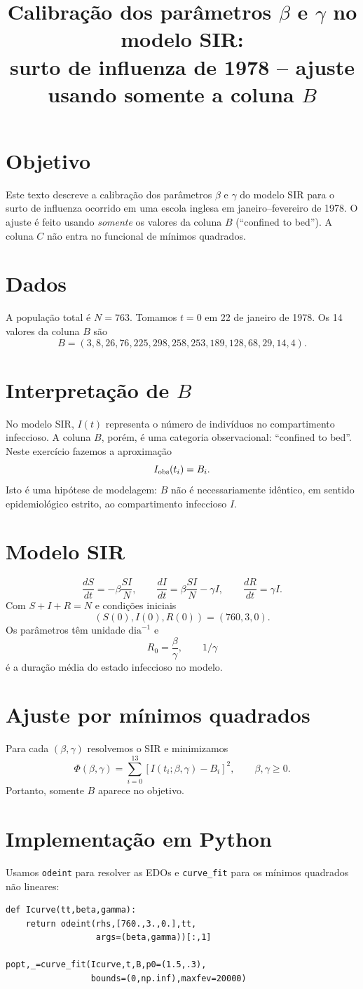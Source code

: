 \documentclass[12pt]{article}
\title{Calibração dos parâmetros $\beta$ e $\gamma$ no modelo SIR:\\ surto de influenza de 1978 -- ajuste usando somente a coluna $B$}
\author{}
\date{}
\begin{document}
\maketitle
\section{Objetivo}
Este texto descreve a calibração dos parâmetros $\beta$ e $\gamma$ do modelo SIR para o surto de influenza ocorrido em uma escola inglesa em janeiro--fevereiro de 1978. O ajuste é feito usando \emph{somente} os valores da coluna $B$ (``confined to bed''). A coluna $C$ não entra no funcional de mínimos quadrados.
\section{Dados}
A população total é $N=763$. Tomamos $t=0$ em 22 de janeiro de 1978. Os 14 valores da coluna $B$ são
\[
B=(3,8,26,76,225,298,258,253,189,128,68,29,14,4).
\]
\section{Interpretação de $B$}
No modelo SIR, $I(t)$ representa o número de indivíduos no compartimento infeccioso. A coluna $B$, porém, é uma categoria observacional: ``confined to bed''. Neste exercício fazemos a aproximação
\[
I_{\rm obs}(t_i)=B_i.
\]
Isto é uma hipótese de modelagem: $B$ não é necessariamente idêntico, em sentido epidemiológico estrito, ao compartimento infeccioso $I$.
\section{Modelo SIR}
\[
\frac{dS}{dt}=-\beta\frac{SI}{N},\qquad
\frac{dI}{dt}=\beta\frac{SI}{N}-\gamma I,\qquad
\frac{dR}{dt}=\gamma I.
\]
Com $S+I+R=N$ e condições iniciais
\[
(S(0),I(0),R(0))=(760,3,0).
\]
Os parâmetros têm unidade $\mathrm{dia}^{-1}$ e
\[
R_0=\frac{\beta}{\gamma},\qquad 1/\gamma
\]
é a duração média do estado infeccioso no modelo.
\section{Ajuste por mínimos quadrados}
Para cada $(\beta,\gamma)$ resolvemos o SIR e minimizamos
\[
\Phi(\beta,\gamma)=\sum_{i=0}^{13}[I(t_i;\beta,\gamma)-B_i]^2,
\qquad \beta,\gamma\geq0.
\]
Portanto, somente $B$ aparece no objetivo.
\section{Implementação em Python}
Usamos \texttt{odeint} para resolver as EDOs e \texttt{curve\_fit} para os mínimos quadrados não lineares:
\begin{verbatim}
def Icurve(tt,beta,gamma):
    return odeint(rhs,[760.,3.,0.],tt,
                  args=(beta,gamma))[:,1]

popt,_=curve_fit(Icurve,t,B,p0=(1.5,.3),
                 bounds=(0,np.inf),maxfev=20000)
\end{verbatim}
\end{document}
